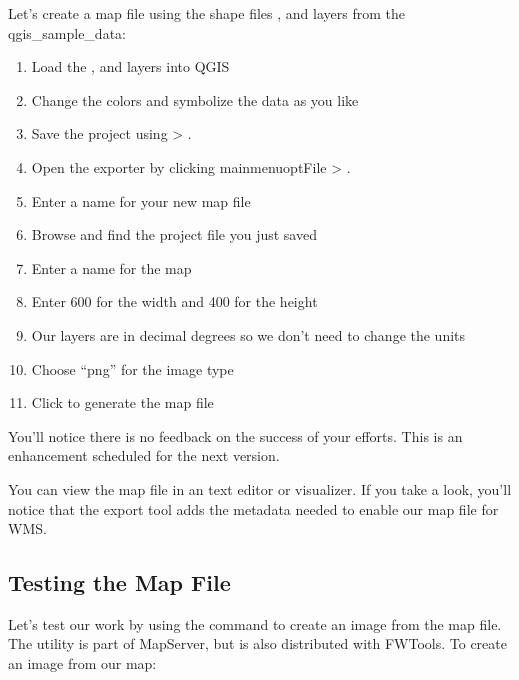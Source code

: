 Let's create a map file using the shape files ,  
and  layers from the qgis\_sample\_data:

\begin{enumerate}
  \item Load the ,  and  
  layers into QGIS
  \item Change the colors and symbolize the data as you like
  \item Save the project using  >
  .
  \item Open the exporter by clicking mainmenuopt{File} > .
  \item Enter a name for your new map file
  \item Browse and find the project file you just saved
  \item Enter a name for the map
  \item Enter 600 for the width and 400 for the height
  \item Our layers are in decimal degrees so we don't need to change the
    units
  \item Choose ``png'' for the image type
  \item Click  to generate the map file
\end{enumerate}



You'll notice there is no feedback on the success of your efforts. This
is an enhancement scheduled for the next version. 

You can view the map file in an text editor or visualizer. If you
take a look, you'll notice that the export tool adds the metadata needed
to enable our map file for WMS. 

\subsection{Testing the Map File}

Let's test our work by using the  command to create an image
from the map file. The   utility is part of MapServer,
but is also distributed with FWTools. To create an image from our map:

